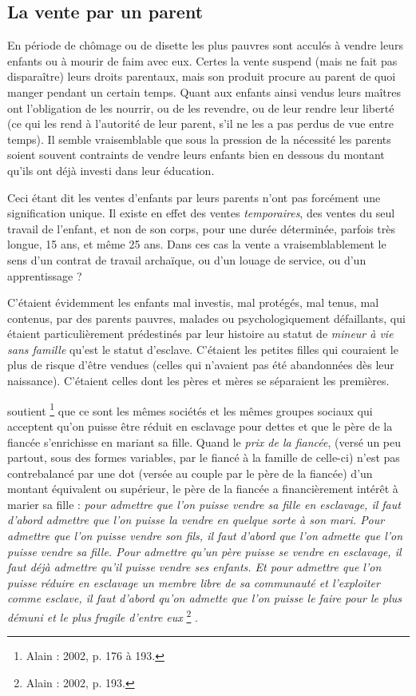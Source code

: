 \subsection{La vente par un parent}

En période de chômage ou de disette les plus pauvres sont acculés
à vendre leurs enfants ou à mourir de faim avec eux. Certes la vente suspend
(mais ne fait pas disparaître) leurs droits parentaux, mais son produit
procure au parent de quoi manger pendant un certain temps. Quant
aux enfants ainsi vendus leurs maîtres ont l'obligation de les nourrir, ou
de les revendre, ou de leur rendre leur liberté (ce qui les rend à l'autorité
de leur parent, s'il ne les a pas perdus de vue entre temps). Il semble vraisemblable
que sous la pression de la nécessité les parents soient souvent
contraints de vendre leurs enfants bien en dessous du montant qu'ils ont
déjà investi dans leur éducation.

Ceci étant dit les ventes d'enfants par leurs parents n'ont pas forcément
une signification unique. Il existe en effet des ventes \emph{temporaires},
des ventes du seul travail de l'enfant, et non de son corps, pour une durée
déterminée, parfois très longue, 15 ans, et même 25 ans. Dans ces cas
la vente a vraisemblablement le sens d'un contrat de travail archaïque, ou
d'un louage de service, ou d'un apprentissage ?

C'étaient évidemment les enfants mal investis, mal protégés, mal
tenus, mal contenus, par des parents pauvres, malades ou psychologiquement
défaillants, qui étaient particulièrement prédestinés par leur histoire
au statut de \emph{mineur à vie sans famille} qu'est le statut d'esclave. C'étaient les
petites filles qui couraient le plus de risque d'être vendues (celles qui
n'avaient pas été abandonnées dès leur naissance). C'étaient celles dont
les pères et mères se séparaient les premières.

 soutient%
\footnote{Alain  : 2002, p. 176 à 193.} 
que ce sont les mêmes sociétés et les mêmes
groupes sociaux qui acceptent qu'on puisse être réduit en esclavage
pour dettes et que le père de la fiancée s'enrichisse en mariant sa fille.
Quand le \emph{prix de la fiancée}, (versé un peu partout, sous des formes variables,
par le fiancé à la famille de celle-ci) n'est pas contrebalancé par une
dot (versée au couple par le père de la fiancée) d'un montant équivalent
ou supérieur, le père de la fiancée a financièrement intérêt à marier sa fille :
{\emph{pour admettre que l'on puisse vendre sa fille en esclavage, il faut d'abord admettre
que l'on puisse la vendre en quelque sorte à son mari. Pour admettre que l'on puisse
vendre son fils, il faut d'abord que l'on admette que l'on puisse vendre sa fille. Pour
admettre qu'un père puisse se vendre en esclavage, il faut déjà admettre qu'il puisse
vendre ses enfants. Et pour admettre que l'on puisse réduire en esclavage un membre
libre de sa communauté et l'exploiter comme esclave, il faut d'abord qu'on admette que
l'on puisse le faire pour le plus démuni et le plus fragile d'entre eux}%
\footnote{Alain  : 2002, p. 193.}%
.}

